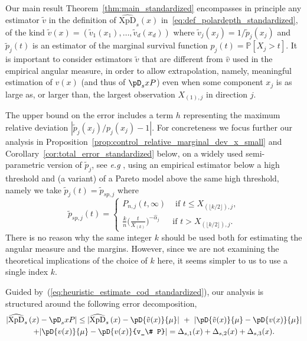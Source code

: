 \documentclass{article}
\numberwithin{equation}{section}
\renewcommand{\P}{\mathbb{P}}
\newcommand{\PP}{\P}%
\newcommand{\XpDsymbol}{\mathrm{XpD}}  %
\newcommand{\coD}[2]{\pD{#1}{#2}}
\newcommand{\coDs}[2]{\pD_s{#1}{#2}}
\newcommand{\hatcoDs}[1]{\widehat{\XpDsymbol}_s\left({#1}\right)}
\newcommand{\coDsinf}[1]{\pD_{s,\infty}({#1})}
\newcommand{\mus}{\mu}%
\begin{document}
Our main result Theorem~\ref{thm:main_standardized} encompasses in principle any estimator $\tilde v$ in the definition of $\hatcoDs{x}$ in~\eqref{eq:def_polardepth_standardized},  of the kind 
$\tilde v(x) = (\tilde v_1(x_1),\ldots, \tilde v_d(x_d))$ where $\tilde v_j(x_j)= 1/\tilde p_j(x_j)$ and $\tilde p_j(t)$ is an estimator of the marginal survival function $p_j(t) = \PP[X_j>t]$. It is important to consider estimators  $\tilde v$ that are different from $\hat v$ used in the empirical angular measure,  in order to allow extrapolation, namely,  meaningful estimation of $v(x)$ (and thus of $\coDs{x}{P}$) even when some component $x_j$ is as large as, or larger than, the largest observation $X_{(1),j}$ in direction $j$. 

The upper bound on the error includes a term $h$ representing the maximum relative deviation $ |\tilde p_j(x_j)/p_j(x_j) -1 |$. For concreteness we focus further our analysis in Proposition~\ref{prop:control_relative_marginal_dev_x_small} and Corollary~\ref{cor:total_error_standardized} below, on a widely used semi-parametric version of $\tilde p_j$, see \emph{e.g} \cite{coles2001introduction},
using an empirical estimator below a high threshold and (a variant) of a Pareto model above the same high threshold, namely we take $\tilde{ p}_j(t) = \tilde{p}_{sp,j}$ where 
\begin{equation}
\label{eq:def_clever_tildev}
\tilde{p}_{sp,j}(t) =
\begin{cases}
    P_{n,j}(t, \infty) & \text{ if } t \le X_{( \lfloor k/2 \rfloor), j },  \\
    \frac{k}{n}\Big(\frac{t}{X_{(k)}}\Big)^{-\hat \alpha_j}& \text{
    if } t >  X_{( \lfloor k/2 \rfloor), j } .
\end{cases}
\end{equation}
There is no reason why the same integer $k$ should be used both for estimating the angular measure and the margins. However, since we are not examining the theoretical implications of the choice of $k$ here, it seems simpler to us to use a single index $k$. 



Guided by~(\ref{eq:heuristic_estimate_cod_standardized}), our analysis is structured around the following error decomposition,  
\begin{multline}
\label{eq:error_decompos_standardized}
    |\hatcoDs{x} - \coDs{x}{P}|
     \le | \hatcoDs{x}  - \pD{\tilde  v(x)}{\mus} | ~+~ %
    | \pD{\tilde v(x)}{\mus} - \pD{ v(x)}{\mus} |   \\ %
      +  |\pD{ v(x)}{\mus} - \pD{v(x)}{v_\# P} |  %
    = \Delta_{s,1}(x) + \Delta_{s,2}(x)+\Delta_{s,3}(x).
\end{multline}
\end{document}
